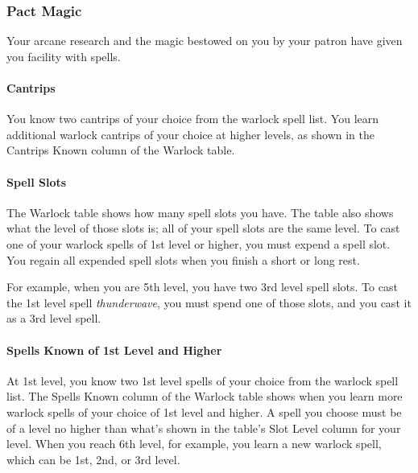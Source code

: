\documentclass[
]{article}
\begin{document}
\hypertarget{pact-magic}{%
\subsubsection{Pact Magic}\label{pact-magic}}

Your arcane research and the magic bestowed on you by your patron have
given you facility with spells.

\hypertarget{cantrips}{%
\paragraph{Cantrips}\label{cantrips}}

You know two cantrips of your choice from the warlock spell list. You
learn additional warlock cantrips of your choice at higher levels, as
shown in the Cantrips Known column of the Warlock table.

\hypertarget{spell-slots}{%
\paragraph{Spell Slots}\label{spell-slots}}

The Warlock table shows how many spell slots you have. The table also
shows what the level of those slots is; all of your spell slots are the
same level. To cast one of your warlock spells of 1st level or higher,
you must expend a spell slot. You regain all expended spell slots when
you finish a short or long rest.

For example, when you are 5th level, you have two 3rd level spell slots.
To cast the 1st level spell \emph{thunderwave}, you must spend one of
those slots, and you cast it as a 3rd level spell.

\hypertarget{spells-known-of-1st-level-and-higher}{%
\paragraph{Spells Known of 1st Level and
Higher}\label{spells-known-of-1st-level-and-higher}}

At 1st level, you know two 1st level spells of your choice from the
warlock spell list. The Spells Known column of the Warlock table shows
when you learn more warlock spells of your choice of 1st level and
higher. A spell you choose must be of a level no higher than what's
shown in the table's Slot Level column for your level. When you reach
6th level, for example, you learn a new warlock spell, which can be 1st,
2nd, or 3rd level.
\end{document}

